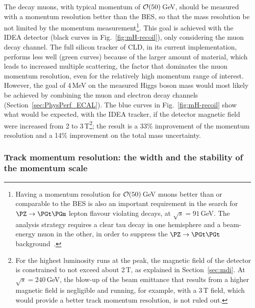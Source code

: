 The decay muons, with typical momentum of ${\cal{O}}(50)$\,GeV, should be measured with a momentum resolution better than the BES,
so that the mass resolution be not limited by the momentum 
measurement\footnote{Having a momentum resolution for ${\cal{O}}(50)$\,GeV muons better than or comparable to the BES is also an important requirement in the search for $\PZ \to \PGt\PGm$ lepton flavour violating decays, at $\sqrt{s} = 91$\,GeV. The analysis strategy requires a clear tau decay in one hemisphere and a beam-energy muon in the other, 
in order to suppress the $\PZ \to \PGt\PGt$ background~\cite{Dam:2018rfz}.}. 
This goal is achieved with the IDEA detector (black curves in Fig.~\ref{fig:mH-recoil}), only considering the muon decay channel. 
The full silicon tracker of CLD, in its current implementation, performs less well (green curves) because of the larger amount of material, 
which leads to increased multiple scattering, the factor that dominates the muon momentum resolution, even for the relatively high momentum range of interest. 
However, the goal of 4\,MeV on the measured Higgs boson mass would most likely be achieved by combining the muon and electron decay channels 
(Section~\ref{sec:PhysPerf_ECAL}). 
The blue curves in Fig.~\ref{fig:mH-recoil} show what would be expected, with the IDEA tracker, 
if the detector magnetic field were increased 
from 2 to 3\,T\footnote{For the highest luminosity runs at the \PZ peak, %
the magnetic field of the detector is constrained to not exceed about 2\,T, as explained in Section~\ref{sec:mdi}. 
At $\sqrt{s} = 240$\,GeV, the blow-up of the beam emittance that results from a higher magnetic field is negligible 
and running, for example, with a 3\,T field, which would provide a better track momentum resolution, is not ruled out.}; 
the result is a 33\% improvement of the momentum resolution and a 14\% improvement on the total mass uncertainty.

\subsubsection{Track momentum resolution: the \texorpdfstring{\PZ}{Z} width and the stability of the momentum scale}


